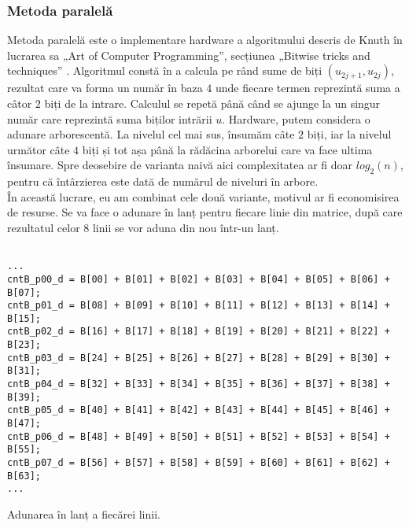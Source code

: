 \documentclass[12pt,twoside,a4paper,fleqn]{book}
\theoremstyle{definition}
\begin{document}
\subsubsection{Metoda paralelă}
Metoda paralelă este o implementare hardware a algoritmului descris de Knuth în lucrarea sa „Art of Computer Programming”, secțiunea „Bitwise tricks and techniques” \cite{knuth}. Algoritmul constă în a calcula pe rând sume de biți $(u_{2j+1}, u_{2j})$, rezultat care va forma un număr în baza $4$ unde fiecare termen reprezintă suma a câtor $2$ biți de la intrare. Calculul se repetă până când se ajunge la un singur număr care reprezintă suma biților intrării $u$. Hardware, putem considera o adunare arborescentă. La nivelul cel mai sus, însumăm câte $2$ biți, iar la nivelul următor câte $4$ biți și tot așa până la rădăcina arborelui care va face ultima însumare. Spre deosebire de varianta naivă aici complexitatea ar fi doar $log_{2}(n)$, pentru că întârzierea este dată de numărul de niveluri în arbore.\\
În această lucrare, eu am combinat cele două variante, motivul ar fi economisirea de resurse. Se va face o adunare în lanț pentru fiecare linie din matrice, după care rezultatul celor $8$ linii se vor aduna din nou într-un lanț.
\begin{fragmentsursa}
\begin{scriptsize}
\begin{verbatim}

...
cntB_p00_d = B[00] + B[01] + B[02] + B[03] + B[04] + B[05] + B[06] + B[07];
cntB_p01_d = B[08] + B[09] + B[10] + B[11] + B[12] + B[13] + B[14] + B[15];	
cntB_p02_d = B[16] + B[17] + B[18] + B[19] + B[20] + B[21] + B[22] + B[23];
cntB_p03_d = B[24] + B[25] + B[26] + B[27] + B[28] + B[29] + B[30] + B[31];
cntB_p04_d = B[32] + B[33] + B[34] + B[35] + B[36] + B[37] + B[38] + B[39];
cntB_p05_d = B[40] + B[41] + B[42] + B[43] + B[44] + B[45] + B[46] + B[47];
cntB_p06_d = B[48] + B[49] + B[50] + B[51] + B[52] + B[53] + B[54] + B[55];
cntB_p07_d = B[56] + B[57] + B[58] + B[59] + B[60] + B[61] + B[62] + B[63];
...
\end{verbatim}
\end{scriptsize}
\caption{Adunarea în lanț a fiecărei linii.}
\label{frag_cnt1}
\end{fragmentsursa}
\end{document}
